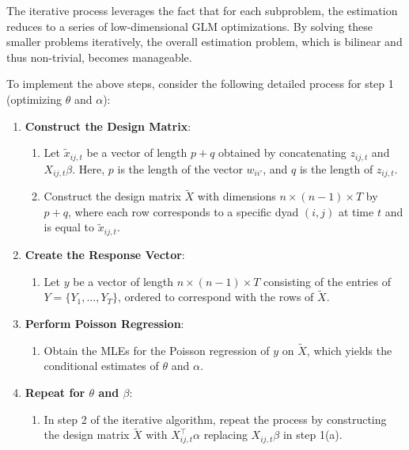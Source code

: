 The iterative process leverages the fact that for each subproblem, the estimation reduces to a series of low-dimensional GLM optimizations. By solving these smaller problems iteratively, the overall estimation problem, which is bilinear and thus non-trivial, becomes manageable.

To implement the above steps, consider the following detailed process for step 1 (optimizing $\theta$ and $\alpha$):

\begin{enumerate}
    \item \textbf{Construct the Design Matrix}:
    \begin{enumerate}
        \item Let $\tilde{x}_{ij,t}$ be a vector of length $p+q$ obtained by concatenating $z_{ij,t}$ and $X_{ij,t} \beta$. Here, $p$ is the length of the vector $w_{ii'}$, and $q$ is the length of $z_{ij,t}$.
        \item Construct the design matrix $\tilde{X}$ with dimensions $n \times (n-1) \times T$ by $p+q$, where each row corresponds to a specific dyad $(i, j)$ at time $t$ and is equal to $\tilde{x}_{ij,t}$.
    \end{enumerate}
    \item \textbf{Create the Response Vector}:
    \begin{enumerate}
        \item Let $y$ be a vector of length $n \times (n-1) \times T$ consisting of the entries of $Y = \{ Y_1, \ldots, Y_T \}$, ordered to correspond with the rows of $\tilde{X}$.
    \end{enumerate}
    \item \textbf{Perform Poisson Regression}:
    \begin{enumerate}
        \item Obtain the MLEs for the Poisson regression of $y$ on $\tilde{X}$, which yields the conditional estimates of $\theta$ and $\alpha$.
    \end{enumerate}
    \item \textbf{Repeat for $\theta$ and $\beta$}:
    \begin{enumerate}
        \item In step 2 of the iterative algorithm, repeat the process by constructing the design matrix $\tilde{X}$ with $X_{ij,t}^{\top} \alpha$ replacing $X_{ij,t} \beta$ in step 1(a).
    \end{enumerate}
\end{enumerate}

